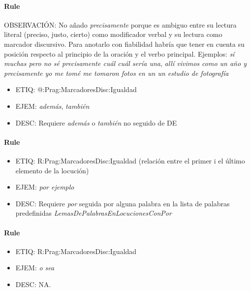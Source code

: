 \documentclass[11pt]{report}
\begin{document}
\paragraph*{Rule}
OBSERVACIÓN: No añado \emph{precisamente} porque es ambiguo entre su lectura literal (preciso, justo, cierto) como modificador verbal y su lectura como marcador discursivo. Para anotarlo con fiabilidad habría que tener en cuenta su posición respecto al principio de la oración y el verbo principal. Ejemplos: \emph{sí muchas pero no sé precisamente cuál cuál sería una}, \emph{allí vivimos como un año y precisamente yo me tomé me tomaron fotos en un un estudio de fotografía}

\begin{itemize}
\item ETIQ: @:Prag:MarcadoresDisc:Igualdad
\item EJEM: \emph{además}, \emph{también}
\item DESC: Requiere \emph{además} o \emph{también} no seguido de DE
\end{itemize}

\paragraph*{Rule}
\begin{itemize}
\item ETIQ: R:Prag:MarcadoresDisc:Igualdad (relación entre el primer i el último elemento de la locución)
\item EJEM: \emph{por ejemplo}
\item DESC: Requiere \emph{por} seguida por alguna palabra en la lista de palabras predefinidas \emph{LemasDePalabrasEnLocucionesConPor}
\end{itemize}

\paragraph*{Rule}
\begin{itemize}
\item ETIQ: R:Prag:MarcadoresDisc:Igualdad
\item EJEM: \emph{o sea}
\item DESC: NA.
\end{itemize}
\end{document}
